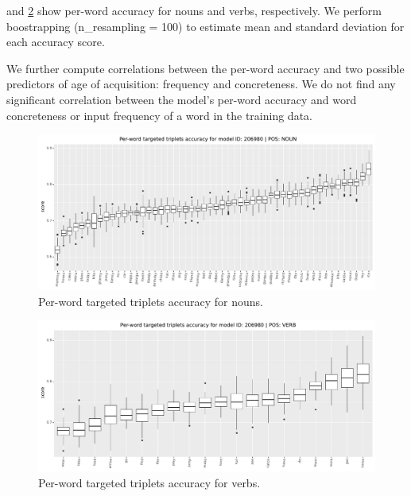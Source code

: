  and
\ref{fig:accuracy_targeted_triplets_verbs} show per-word
accuracy for nouns and verbs, respectively. We perform boostrapping (n\_resampling = 100) to estimate mean and standard deviation for each accuracy score.

We further compute correlations between the per-word accuracy and two 
possible predictors of age of acquisition: frequency and concreteness. 
We do not find any significant correlation between the model's per-word 
accuracy and word concreteness or input frequency of a word in the 
training data.




\begin{figure}[htb]
  \centering
  \includegraphics[width=\textwidth]{results/targeted_triplets/results_per_word_version_206980_NOUN.pdf}
  \caption{Per-word targeted triplets accuracy for nouns.}
  \label{fig:accuracy_targeted_triplets_nouns}
\end{figure}

\begin{figure}[htb]
  \centering
  \includegraphics[width=\textwidth]{results/targeted_triplets/results_per_word_version_206980_VERB.pdf}
  \caption{Per-word targeted triplets accuracy for verbs.}
  \label{fig:accuracy_targeted_triplets_verbs}
\end{figure}
